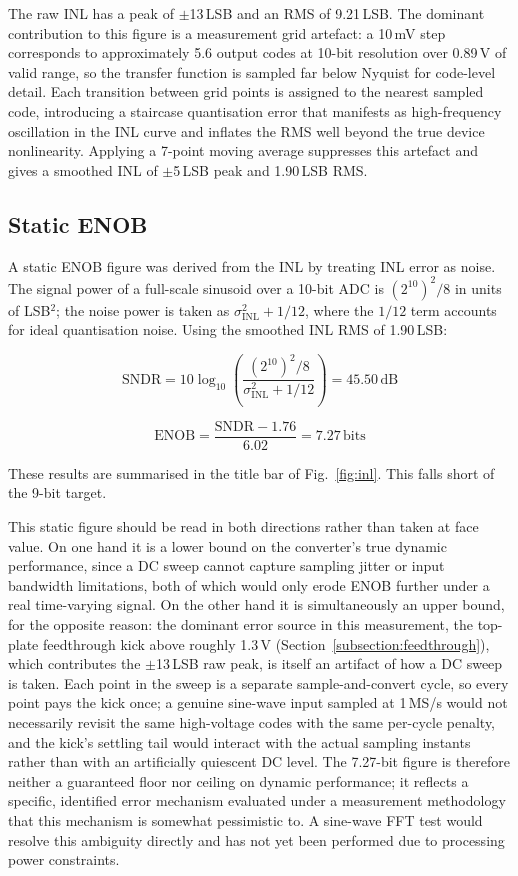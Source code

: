 \documentclass[12pt, a4paper]{article}
\begin{document}
The raw INL has a peak of $\pm$13\,LSB and an RMS of 9.21\,LSB. The dominant contribution to this figure is a measurement grid artefact: a 10\,mV step corresponds to approximately 5.6 output codes at 10-bit resolution over 0.89\,V of valid range, so the transfer function is sampled far below Nyquist for code-level detail. Each transition between grid points is assigned to the nearest sampled code, introducing a staircase quantisation error that manifests as high-frequency oscillation in the INL curve and inflates the RMS well beyond the true device nonlinearity. Applying a 7-point moving average suppresses this artefact and gives a smoothed INL of $\pm$5\,LSB peak and 1.90\,LSB RMS.

\subsection{Static ENOB}

A static ENOB figure was derived from the INL by treating INL error as noise. The signal power of a full-scale sinusoid over a 10-bit ADC is $(2^{10})^2/8$ in units of LSB$^2$; the noise power is taken as $\sigma_{\mathrm{INL}}^2 + 1/12$, where the $1/12$ term accounts for ideal quantisation noise. Using the smoothed INL RMS of 1.90\,LSB:

\begin{equation}
    \mathrm{SNDR} = 10\log_{10}\!\left(\frac{(2^{10})^2/8}{\sigma_{\mathrm{INL}}^2 + 1/12}\right) = 45.50\,\mathrm{dB}
\end{equation}

\begin{equation}
    \mathrm{ENOB} = \frac{\mathrm{SNDR} - 1.76}{6.02} = 7.27\,\mathrm{bits}
\end{equation}

These results are summarised in the title bar of Fig.~\ref{fig:inl}. This falls short of the 9-bit target.

This static figure should be read in both directions rather than taken at face value. On one hand it is a lower bound on the converter's true dynamic performance, since a DC sweep cannot capture sampling jitter or input bandwidth limitations, both of which would only erode ENOB further under a real time-varying signal. On the other hand it is simultaneously an upper bound, for the opposite reason: the dominant error source in this measurement, the top-plate feedthrough kick above roughly 1.3\,V (Section~\ref{subsection:feedthrough}), which contributes the $\pm$13\,LSB raw peak, is itself an artifact of how a DC sweep is taken. Each point in the sweep is a separate sample-and-convert cycle, so every point pays the kick once; a genuine sine-wave input sampled at 1\,MS/s would not necessarily revisit the same high-voltage codes with the same per-cycle penalty, and the kick's settling tail would interact with the actual sampling instants rather than with an artificially quiescent DC level. The 7.27-bit figure is therefore neither a guaranteed floor nor ceiling on dynamic performance; it reflects a specific, identified error mechanism evaluated under a measurement methodology that this mechanism is somewhat pessimistic to. A sine-wave FFT test would resolve this ambiguity directly and has not yet been performed due to processing power constraints.
\end{document}
